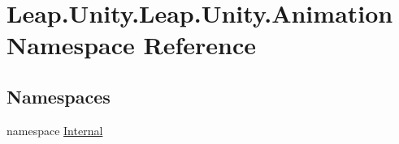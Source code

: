 \hypertarget{namespace_leap_1_1_unity_1_1_leap_1_1_unity_1_1_animation}{}\section{Leap.\+Unity.\+Leap.\+Unity.\+Animation Namespace Reference}
\label{namespace_leap_1_1_unity_1_1_leap_1_1_unity_1_1_animation}
\subsection*{Namespaces}
\begin{DoxyCompactItemize}
\item 
namespace \mbox{\hyperlink{namespace_leap_1_1_unity_1_1_leap_1_1_unity_1_1_animation_1_1_internal}{Internal}}
\end{DoxyCompactItemize}
